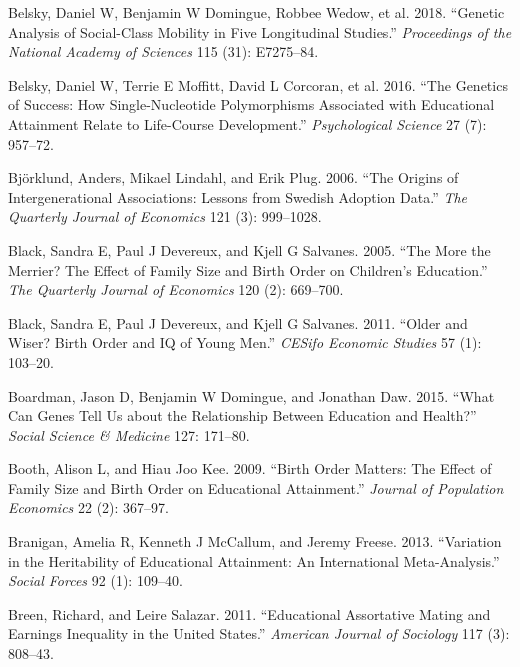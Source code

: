\documentclass[
  12pt,
]{article}
\newlength{\cslhangindent}
\newenvironment{CSLReferences}[2] %
 {\begin{list}{}{%
  \setlength{\itemindent}{0pt}
  \setlength{\leftmargin}{0pt}
  \setlength{\parsep}{0pt}
  \ifodd #1
   \setlength{\leftmargin}{\cslhangindent}
   \setlength{\itemindent}{-1\cslhangindent}
  \fi
  \setlength{\itemsep}{#2\baselineskip}}}
 {\end{list}}
\theoremstyle{definition}
\theoremstyle{definition}
\theoremstyle{definition}
\theoremstyle{definition}
\theoremstyle{remark}
\begin{document}
\begin{CSLReferences}{1}{1}
{Belsky, Daniel W, Benjamin W Domingue, Robbee Wedow, et al.} 2018. {``Genetic Analysis of Social-Class Mobility in Five Longitudinal Studies.''} \emph{Proceedings of the National Academy of Sciences} 115 (31): E7275--84.

{Belsky, Daniel W, Terrie E Moffitt, David L Corcoran, et al.} 2016. {``The Genetics of Success: How Single-Nucleotide Polymorphisms Associated with Educational Attainment Relate to Life-Course Development.''} \emph{Psychological Science} 27 (7): 957--72.

Björklund, Anders, Mikael Lindahl, and Erik Plug. 2006. {``The Origins of Intergenerational Associations: Lessons from Swedish Adoption Data.''} \emph{The Quarterly Journal of Economics} 121 (3): 999--1028.

Black, Sandra E, Paul J Devereux, and Kjell G Salvanes. 2005. {``The More the Merrier? The Effect of Family Size and Birth Order on Children's Education.''} \emph{The Quarterly Journal of Economics} 120 (2): 669--700.

Black, Sandra E, Paul J Devereux, and Kjell G Salvanes. 2011. {``Older and Wiser? Birth Order and IQ of Young Men.''} \emph{CESifo Economic Studies} 57 (1): 103--20.

Boardman, Jason D, Benjamin W Domingue, and Jonathan Daw. 2015. {``What Can Genes Tell Us about the Relationship Between Education and Health?''} \emph{Social Science \& Medicine} 127: 171--80.

Booth, Alison L, and Hiau Joo Kee. 2009. {``Birth Order Matters: The Effect of Family Size and Birth Order on Educational Attainment.''} \emph{Journal of Population Economics} 22 (2): 367--97.

Branigan, Amelia R, Kenneth J McCallum, and Jeremy Freese. 2013. {``Variation in the Heritability of Educational Attainment: An International Meta-Analysis.''} \emph{Social Forces} 92 (1): 109--40.

Breen, Richard, and Leire Salazar. 2011. {``Educational Assortative Mating and Earnings Inequality in the United States.''} \emph{American Journal of Sociology} 117 (3): 808--43.


\end{CSLReferences}
\end{document}
